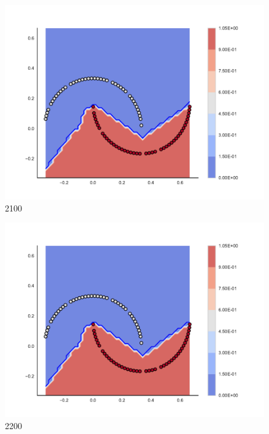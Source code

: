 \begin{subfigure}[b]{0.09\textwidth}
    \includegraphics[clip, trim=2.35cm 1.75cm 4.5cm 0cm,width=\textwidth]{img/convergence/2100.pdf}
    \caption{2100}
    \label{fig:convergence_2100}
\end{subfigure}
%
\begin{subfigure}[b]{0.09\textwidth}
    \includegraphics[clip, trim=2.35cm 1.75cm 4.5cm 0cm,width=\textwidth]{img/convergence/2200.pdf}
    \caption{2200}
    \label{fig:convergence_2200}
\end{subfigure}
%
